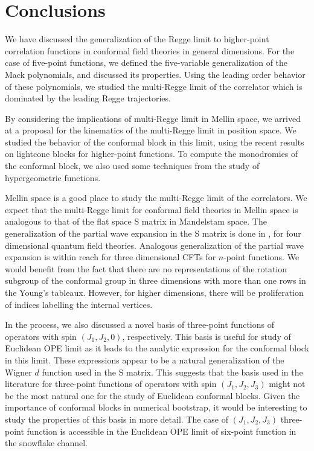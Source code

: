 
\section{Conclusions}
\label{sec:conclusions}

We have discussed the generalization of the Regge limit to higher-point correlation functions in conformal field theories in general dimensions.
For the case of five-point functions, we defined the five-variable generalization of the Mack polynomials, and discussed its properties.
Using the leading order behavior of these polynomials, we studied the multi-Regge limit of the correlator which is dominated by the leading Regge trajectories.

By considering the implications of multi-Regge limit in Mellin space, we arrived at a proposal for the kinematics of the multi-Regge limit in  position space.
We studied the behavior of the conformal block in this limit, using the recent results on lightcone blocks for higher-point functions.
To compute the monodromies of the conformal block, we also used some techniques from the study of hypergeometric functions. 

Mellin space is a good place to study the multi-Regge limit of the correlators.
We expect that the multi-Regge limit for conformal field theories in Mellin space is analogous to that of the flat space S matrix in Mandelstam space.
The generalization of the partial wave expansion in the S matrix is done in \cite{White:1976qm}, for four dimensional quantum field theories.
Analogous generalization of the partial wave expansion is within reach for three dimensional CFTs for $n$-point functions.
We would benefit from the fact that there are no representations of the rotation subgroup of the conformal group in three dimensions with more than one rows in the Young's tableaux.
However, for higher dimensions, there will be proliferation of indices labelling the internal vertices.


In the process, we also discussed a novel basis of three-point functions of operators with spin $\left(  J_1,J_2,0  \right)$, respectively.
This basis is useful for study of Euclidean OPE limit as it leads to the analytic expression for the conformal block in this limit.
These expressions appear to be a natural generalization of the Wigner $ d $ function used in the S matrix.
This suggests that the basis used in the literature for three-point functions of operators with spin $\left(  J_1,J_2,J_3  \right)$ might not be the most natural one for the study of Euclidean conformal blocks.
Given the importance of conformal blocks in numerical bootstrap, it would be interesting to study the properties of this basis in more detail.
The case of $\left(  J_1,J_2,J_3  \right)$ three-point function is accessible in the Euclidean OPE limit of six-point function in the snowflake channel.


